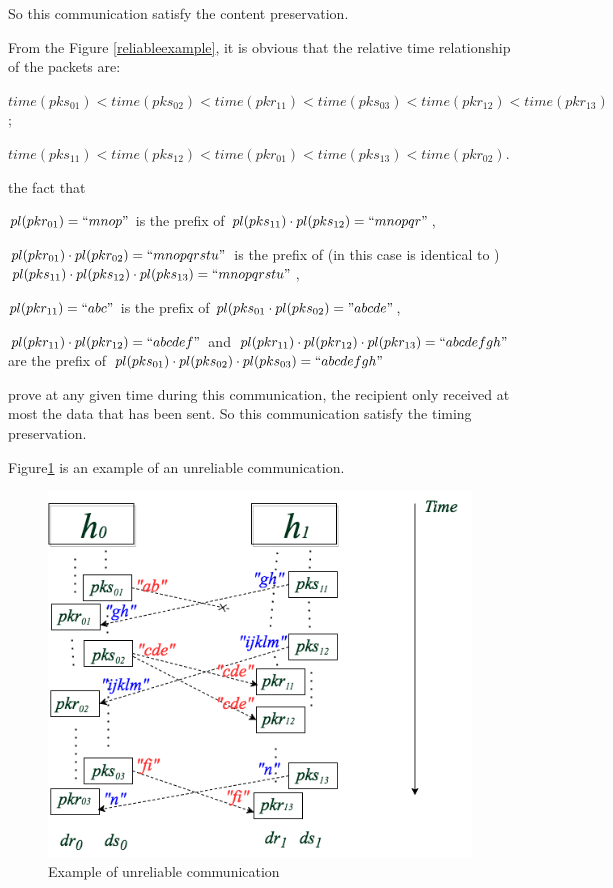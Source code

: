 So this communication satisfy the content preservation. 

From the Figure \ref{reliableexample}, it is obvious that the relative time relationship of the packets are: 

$time(pks_{01}) < time(pks_{02}) < time(pkr_{11})< time(pks_{03}) < time(pkr_{12}) < time(pkr_{13}) $;

$time(pks_{11}) < time(pks_{12}) < time(pkr_{01})< time(pks_{13}) < time(pkr_{02})$. 

the fact that
 
$pl(pkr_{01}) = ``mnop"$ is the prefix of $pl(pks_{11}) \cdot  pl(pks_{12}) = ``mnopqr"$,

$pl(pkr_{01}) \cdot pl(pkr_{02})=``mnopqrstu"$ is the prefix of (in this case is identical to ) $pl(pks_{11}) \cdot pl(pks_{12}) \cdot pl(pks_{13}) = ``mnopqrstu" $,  

$pl(pkr_{11})=``abc"$ is the prefix of $pl(pks_{01} \cdot pl(pks_{02}) = "abcde"$,  

$pl(pkr_{11}) \cdot pl(pkr_{12})= ``abcdef"$ and  $pl(pkr_{11}) \cdot pl(pkr_{12}) \cdot pl(pkr_{13}) = ``abcdefgh"$ are  the prefix of  $pl(pks_{01}) \cdot pl(pks_{02}) \cdot pl(pks_{03})= ``abcdefgh"$

prove at any given time during this communication, the recipient only received at most the data that has been sent. So this communication satisfy the timing preservation. 


Figure\ref{unreliableexample} is an example of an unreliable communication. 

\begin{figure}[H]
\centerline{\includegraphics[scale=0.5]{Figures/unreliableexample}}
\caption{Example of unreliable communication}
\label{unreliableexample}
\end{figure}

